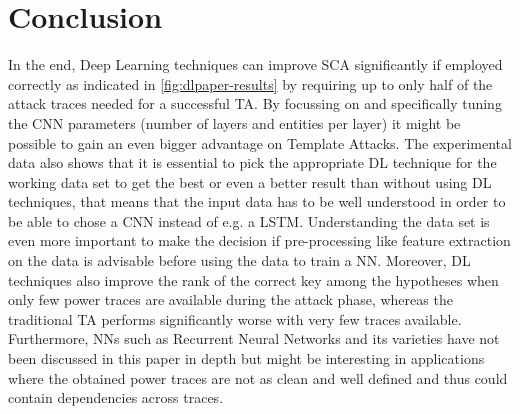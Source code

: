 \documentclass[journal]{IEEEtran}
\begin{document}
%


\section{Conclusion}
In the end, Deep Learning techniques can improve SCA significantly if employed correctly as indicated in \autoref{fig:dlpaper-results} by requiring up to only half of the attack traces needed for a successful TA. By focussing on and specifically tuning the CNN parameters (number of layers and entities per layer) it might be possible to gain an even bigger advantage on Template Attacks. The experimental data also shows that it is essential to pick the appropriate DL technique for the working data set to get the best or even a better result than without using DL techniques, that means that the input data has to be well understood in order to be able to chose a CNN instead of e.g. a LSTM. Understanding the data set is even more important to make the decision if pre-processing like feature extraction on the data is advisable before using the data to train a NN. Moreover, DL techniques also improve the rank of the correct key among the hypotheses when only few power traces are available during the attack phase, whereas the traditional TA performs significantly worse with very few traces available. \\
Furthermore, NNs such as Recurrent Neural Networks and its varieties have not been discussed in this paper in depth but might be interesting in applications where the obtained power traces are not as clean and well defined and thus could contain dependencies across traces. 
\end{document}
